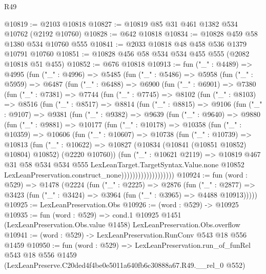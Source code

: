 \begin{lexlean}{R49}
\begin{coremodule}
@10819 := @2103 @10818
@10827 := @10819 @85 @31 @461 @1382 @534 @10762 (@2192 @10760)
@10828 := @642 @10818
@10834 := @10828 @459 @58 @1380 @534 @10760 @555
@10841 := @2033 @10818 @48 @458 @536 @1379 @10791 @10760
@10851 := @10828 @456 @58 @534 @534 @455 @555 (@2082 @10818 @51 @455)
@10852 := @676 @10818
@10913 := fun ("_" : @4489) =>
  @4995
    (fun ("_" : @4996) =>
    @5485
      (fun ("_" : @5486) =>
      @5958
        (fun ("_" : @5959) =>
        @6487
          (fun ("_" : @6488) =>
          @6900
            (fun ("_" : @6901) =>
            @7380
              (fun ("_" : @7381) =>
              @7744
                (fun ("_" : @7745) =>
                @8102
                  (fun ("_" : @8103) =>
                  @8516
                    (fun ("_" : @8517) =>
                    @8814
                      (fun ("_" : @8815) =>
                      @9106
                        (fun ("_" : @9107) =>
                        @9381
                          (fun ("_" : @9382) =>
                          @9639
                            (fun ("_" : @9640) =>
                            @9880
                              (fun ("_" : @9881) =>
                              @10177
                                (fun ("_" : @10178) =>
                                @10358
                                  (fun ("_" : @10359) =>
                                  @10606
                                    (fun ("_" : @10607) =>
                                    @10738
                                      (fun ("_" : @10739) =>
                                      @10813
                                        (fun ("_" : @10622) =>
                                        @10827
                                          (@10834 (@10841 (@10851 @10852) @10804) @10852)
                                          (@2220 @10760))
                                        (fun ("_" : @10621 @2119) =>
                                        @10819
                                          @467
                                          @31
                                          @58
                                          @534
                                          @534
                                          @555
                                          LexLeanTarget.TargetSyntax.Value.none
                                          @10852
                                          LexLeanPreservation.construct_none)))))))))))))))))))
@10924 := fun (word : @529) =>
  @1478
    (@2224
      (fun ("_" : @2225) =>
      @2876
        (fun ("_" : @2877) =>
        @3423 (fun ("_" : @3424) => @3964 (fun ("_" : @3965) => @4488 @10913)))))
@10925 := LexLeanPreservation.Obs
@10926 := (word : @529) -> @10925
@10935 := fun (word : @529) =>
  cond.{1} @10925 @1451 (LexLeanPreservation.Obs.value @1458) LexLeanPreservation.Obs.overflow
@10941 := (word : @529) -> LexLeanPreservation.RunConv @543 @18 @556 @1459
@10950 := fun (word : @529) =>
  LexLeanPreservation.run_of_funRel
    @543
    @18
    @556
    @1459
    (LexLeanPreserve.C20ded4f4be0e5011a640fb6c30888a67.R49.__rel_0 @552)
\end{coremodule}
\end{lexlean}
